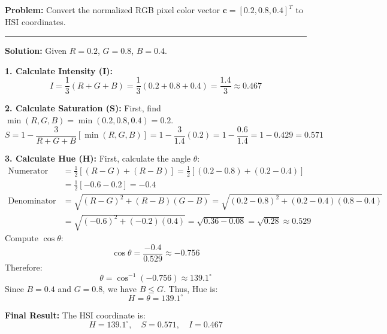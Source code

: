 \documentclass[12pt,a4paper]{article}
\begin{document}
\begin{tcolorbox}[examplebox, title={RGB to HSI Conversion}]
\textbf{Problem:} Convert the normalized RGB pixel color vector $\mathbf{c} = [0.2, 0.8, 0.4]^T$ to HSI coordinates.

\par\noindent\rule{\linewidth}{0.5pt}\par
\textbf{Solution:}
Given $R = 0.2$, $G = 0.8$, $B = 0.4$.

\textbf{1. Calculate Intensity (I):}
\begin{equation*}
  I = \frac{1}{3}(R + G + B) = \frac{1}{3}(0.2 + 0.8 + 0.4) = \frac{1.4}{3} \approx 0.467
\end{equation*}

\textbf{2. Calculate Saturation (S):}
First, find $\min(R,G,B) = \min(0.2, 0.8, 0.4) = 0.2$.
\begin{equation*}
  S = 1 - \frac{3}{R + G + B} \left[ \min(R, G, B) \right] = 1 - \frac{3}{1.4}(0.2) = 1 - \frac{0.6}{1.4} = 1 - 0.429 = 0.571
\end{equation*}

\textbf{3. Calculate Hue (H):}
First, calculate the angle $\theta$:
\begin{align*}
  \text{Numerator} &= \frac{1}{2} \left[ (R - G) + (R - B) \right] = \frac{1}{2} \left[ (0.2 - 0.8) + (0.2 - 0.4) \right] \\
  &= \frac{1}{2} \left[ -0.6 - 0.2 \right] = -0.4 \\[4pt]
  \text{Denominator} &= \sqrt{(R-G)^2 + (R-B)(G-B)} = \sqrt{(0.2-0.8)^2 + (0.2-0.4)(0.8-0.4)} \\
  &= \sqrt{(-0.6)^2 + (-0.2)(0.4)} = \sqrt{0.36 - 0.08} = \sqrt{0.28} \approx 0.529
\end{align*}
Compute $\cos\theta$:
\begin{equation*}
  \cos\theta = \frac{-0.4}{0.529} \approx -0.756
\end{equation*}
Therefore:
\begin{equation*}
  \theta = \cos^{-1}(-0.756) \approx 139.1^\circ
\end{equation*}
Since $B = 0.4$ and $G = 0.8$, we have $B \le G$. Thus, Hue is:
\begin{equation*}
  H = \theta = 139.1^\circ
\end{equation*}

\par\noindent\textbf{Final Result:}
The HSI coordinate is:
\begin{equation*}
  H = 139.1^\circ, \quad S = 0.571, \quad I = 0.467
\end{equation*}
\end{tcolorbox}
\end{document}
